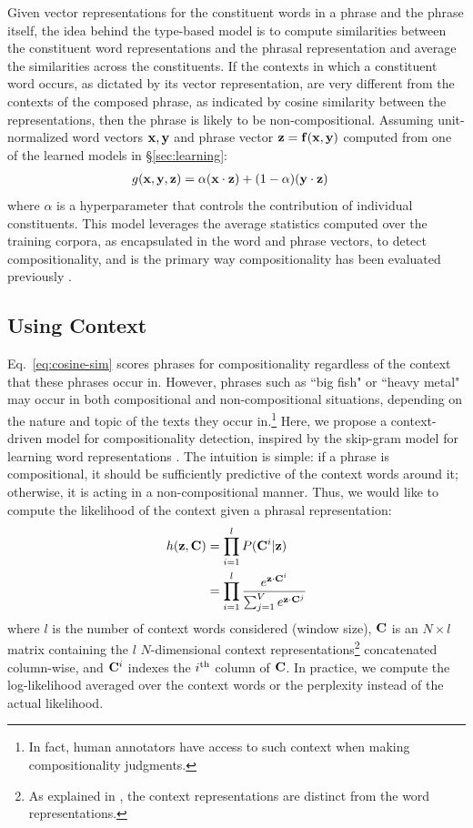 \documentclass[11pt,letterpaper]{article}
\newcommand{\bX}{{\bf x}}
\newcommand{\bY}{{\bf y}}
\newcommand{\bZ}{{\bf z}}
\newcommand{\bF}{{\bf f}}
\newcommand{\bC}{{\bf C}}
\begin{document}
Given vector representations for the constituent words in a phrase and the phrase itself, the idea behind the type-based model is to compute similarities between the constituent word representations and the phrasal representation and average the similarities across the constituents. 
If the contexts in which a constituent word occurs, as dictated by its vector representation, are very different from the contexts of the composed phrase, as indicated by cosine similarity between the representations, then the phrase is likely to be non-compositional. 
Assuming unit-normalized word vectors $\bX, \bY$ and phrase vector $\bZ = \bF(\bX, \bY)$ computed from one of the learned models in \S\ref{sec:learning}:
\begin{align}
	g(\bX, \bY, \bZ) &= \alpha (\bX \cdot \bZ) + (1-\alpha)(\bY \cdot \bZ)
	\label{eq:cosine-sim}
\end{align}
where $\alpha$ is a hyperparameter that controls the contribution of individual constituents. 
This model leverages the average statistics computed over the training corpora, as encapsulated in the word and phrase vectors, to detect compositionality, and is the primary way compositionality has been evaluated previously \cite{Reddy2011,Kiela2013}. 

\subsection{Using Context}
\label{sec:context}

Eq.~\ref{eq:cosine-sim} scores phrases for compositionality regardless of the context that these phrases occur in. 
However, phrases such as ``big fish" or ``heavy metal" may occur in both compositional and non-compositional situations, depending on the nature and topic of the texts they occur in.\footnote{In fact, human annotators have access to such context when making compositionality judgments.}
Here, we propose a context-driven model for compositionality detection, inspired by the skip-gram model for learning word representations \cite{Mikolov2013b}. 
The intuition is simple: if a phrase is compositional, it should be sufficiently predictive of the context words around it; otherwise, it is acting in a non-compositional manner. 
Thus, we would like to compute the likelihood of the context given a phrasal representation:
\begin{align}
	h(\bZ, \bC) &= \prod_{i=1}^l P(\bC^i | \bZ) \nonumber \\
	&= \prod_{i=1}^l \frac{e^{\bZ \cdot \bC^i}}{\sum_{j=1}^{V} e^{\bZ \cdot \bC^j}}
	\label{eq:likelihood}
\end{align}
where $l$ is the number of context words considered (window size), $\bC$ is an $N \times l$ matrix containing the $l$ $N$-dimensional context representations\footnote{As explained in , the context representations are distinct from the word representations.} concatenated column-wise, and $\bC^i$ indexes the $i\textsuperscript{th}$ column of $\bC$. 
In practice, we compute the log-likelihood averaged over the context words or the perplexity instead of the actual likelihood. 
\end{document}
